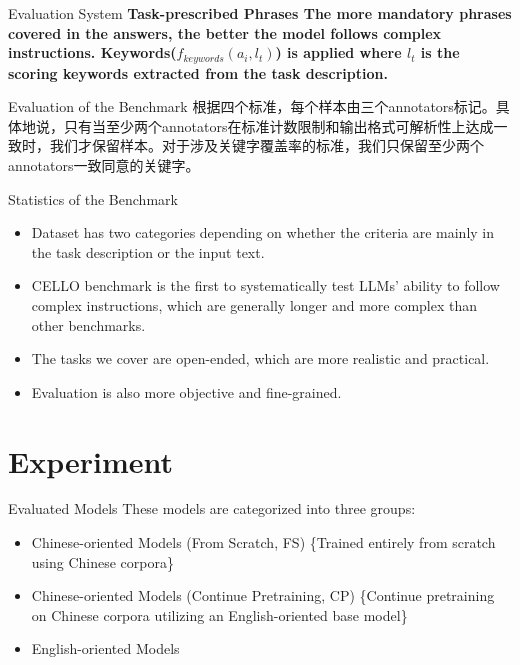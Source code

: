 \documentclass{beamer}
\begin{document}
\begin{frame}{Evaluation System}
    \large\bfseries{Task-prescribed Phrases}
    \newline
    \normalfont
    The more mandatory phrases covered in the answers, the better the model follows complex instructions.
    \newline
    \newline
    Keywords($f_{keywords}(a_i, l_t)$) is applied where $l_t$ is the scoring keywords extracted from the task description.
\end{frame}

\begin{frame}{Evaluation of the Benchmark}
    根据四个标准，每个样本由三个annotators标记。具体地说，只有当至少两个annotators在标准计数限制和输出格式可解析性上达成一致时，我们才保留样本。对于涉及关键字覆盖率的标准，我们只保留至少两个annotators一致同意的关键字。
\end{frame}

\begin{frame}{Statistics of the Benchmark}
    \begin{itemize}
        \item {Dataset has two categories depending on whether the criteria are mainly in the task description or the input text.}
        \item {CELLO benchmark is the first to systematically test LLMs' ability to follow complex instructions, which are generally longer and more complex than other benchmarks.}
        \item {The tasks we cover are open-ended, which are more realistic and practical.}
        \item {Evaluation is also more objective and fine-grained.}
    \end{itemize}
\end{frame}

\section{Experiment}

\begin{frame}{Evaluated Models}
    These models are categorized into three groups:
    \begin{itemize}
        \item {Chinese-oriented Models (From Scratch, FS) \{Trained entirely from scratch using Chinese corpora\}}
        \item {Chinese-oriented Models (Continue Pretraining, CP) \{Continue pretraining on Chinese corpora utilizing an English-oriented base model\}}
        \item {English-oriented Models}
    \end{itemize}
\end{frame}
\end{document}
